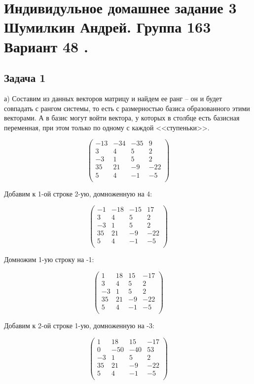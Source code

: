 

	\section{Индивидульное домашнее задание 3 \\ Шумилкин Андрей. Группа 163 \\ Вариант 48	. } 
	\subsection{Задача 1} 
	
	а) Составим из данных векторов матрицу и найдем ее ранг -- он и будет совпадать с рангом системы, то есть с размерностью базиса образованного этими векторами. А в базис могут войти вектора, у которых в столбце есть базисная переменная, при этом только по одному с каждой <<ступеньки>>.
	
	\[
	\begin{pmatrix}
	-13 & -34 & -35 & 9 \\
	3 & 4 & 5 & 2 \\
	-3 & 1 & 5 & 2 \\
	35 & 21 & -9 & -22 \\
	5 & 4 & -1 & -5 \\
	\end{pmatrix}
	\]
	
	Добавим к 1-ой строке 2-ую, домноженную на 4:
	
	\[
	\begin{pmatrix}
	-1 & -18 & -15 & 17 \\
	3 & 4 & 5 & 2 \\
	-3 & 1 & 5 & 2 \\
	35 & 21 & -9 & -22 \\
	5 & 4 & -1 & -5 \\
	\end{pmatrix}
	\]
	
	Домножим 1-ую строку на -1:
	
	\[
	\begin{pmatrix}
	1 & 18 & 15 & -17 \\
	3 & 4 & 5 & 2 \\
	-3 & 1 & 5 & 2 \\
	35 & 21 & -9 & -22 \\
	5 & 4 & -1 & -5 \\
	\end{pmatrix}
	\]
	
	Добавим к 2-ой строке 1-ую, домноженную на -3:
	
	\[
	\begin{pmatrix}
	1 & 18 & 15 & -17 \\
	0 & -50 & -40 & 53 \\
	-3 & 1 & 5 & 2 \\
	35 & 21 & -9 & -22 \\
	5 & 4 & -1 & -5 \\
	\end{pmatrix}
	\]
	
